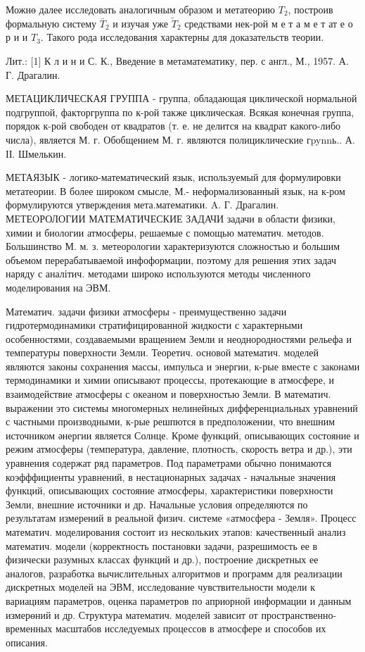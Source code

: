 \documentclass[10pt]{article}
\begin{document}
Можнө далее исследовать аналогичным образом и метатеорию $T_{2}$, построив формальную систему $\bar{T}_{2}$ и изучая уже $\tilde{T}_{2}$ средствами нек-рой м е т а м е т ат е о р и и $T_{3}$. Такого рода исследования характерны для доказательств теории.



Лит.: [1] К л и н и С. К., Введение в метаматематику, пер. с англ., М., 1957. А. Г. Драгалин.



МЕТАЦИКЛИЧЕСКАЯ ГРУППА - группа, обладающая циклической нормальной подгруппой, факторгруппа по к-рой также циклическая. Всякая конечная группа, порядок к-рой свободен от квадратов (т. е. не делится на квадрат какого-либо числа), является М. г. Обобщением М. г. являются полициклические гpynnь.. А. ІІ. Шмелькин.



МЕТАЯЗЫК - логико-математический язык, используемый для формулировки метатеории. В более широком смысле, М.- неформализованный язык, на к-ром формулируются утверждения мета.математики. A. Г. Драгалин. МЕТЕОРОЛОГИИ МАТЕМАТИЧЕСКИЕ ЗАДАЧИ задачи в области физики, химии и биологии атмосферы, решаемые с помощью математич. методов. Большинство М. м. з. метеорологии характеризуются сложностью и большим объемом перерабатываемой инфоформации, поэтому для решения этих задач наряду с аналітич. методами широко используются методы численного моделирования на ЭВМ.



Математич. задачи физики атмосферы - преимущественно задачи гидротермодинамики стратифицированной жидкости с характерными особенностями, создаваемыми вращением Земли и неоднородностями рельефа и температуры поверхности Земли. Теоретич. основой математич. моделей являются законы сохранения массы, импульса и энергии, к-рые вместе с законами термодинамики и химии описывают процессы, протекающие в атмосфере, и взаимодействие атмосферы с океаном и поверхностью Земли. В математич. выражении это системы многомерных нелинейных дифференциальных уравнений с частными производными, к-рые решпются в предположении, что внешним источником әнергии является Солнце. Кроме функций, описывающих состояние и режим атмосферы (температура, давление, плотность, скорость ветра и др.), эти уравнения содержат ряд параметров. Под параметрами обычно понимаются коэфффициенты уравнений, в нестационарных задачах - начальные значения функций, описывающих состояние атмосферы, характеристики поверхности Земли, внешние источники и др. Начальные условия определяются по результатам измерений в реальной физич. системе «атмосфера - Земля». Процесс математич. моделирования состоит из нескольких этапов: качественный анализ математич. модели (корректность постановки задачи, разрешимость ее в физически разумных классах функций и др.), построение дискретных ее аналогов, разработка вычислительных алгоритмов и программ для реализации дискретных моделей на ЭВМ, исследование чувствительности модели к вариациям параметров, оценка параметров по априорной информации и данным измерөний и др. Структура математич. моделей зависит от пространственно-временных масштабов исследуемых процессов в атмосфере и способов их описания.
\end{document}
